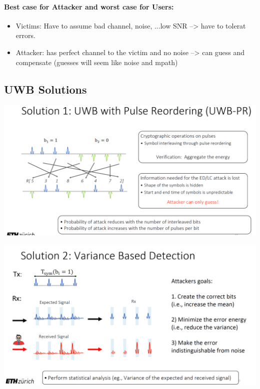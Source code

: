 \paragraph{Best case for Attacker and worst case for Users:}
\begin{itemize}
    \item Victims: Have to assume bad channel, noise, ...low SNR --> have to tolerat errors.
    \item Attacker: has perfect channel to the victim and no noise --> can guess and compensate (guesses will seem like noise and mpath)
\end{itemize}

\subsection{UWB Solutions}
\begin{minipage}{\linewidth}
    \centering      
    \includegraphics[width=\linewidth]{Figures/L5_sol1.PNG} 
\end{minipage}
\begin{minipage}{\linewidth}
    \centering      
    \includegraphics[width=\linewidth]{Figures/L5_sol2.PNG} 
\end{minipage}


